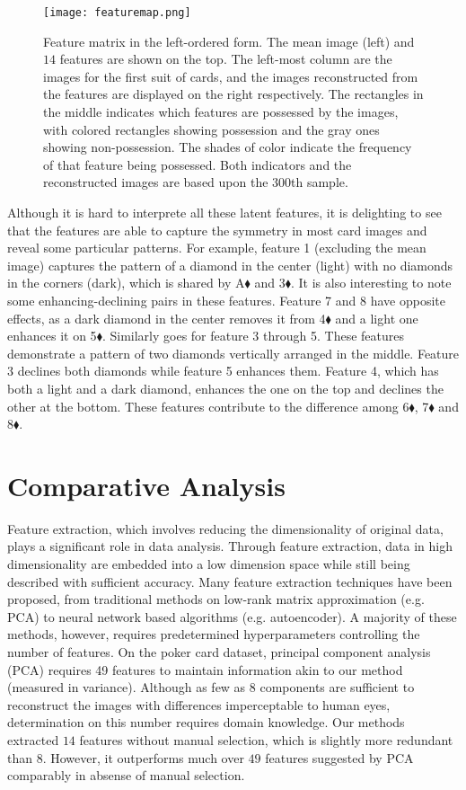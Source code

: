 \documentclass{article}
\begin{document}
\begin{figure}[!h]
  \centering
  \texttt{[image: featuremap.png]} 
  \caption{Feature matrix in the left-ordered form. The mean image (left) and $14$ features are shown on the top. The left-most column are the images for the first suit of cards, and the images reconstructed from the features are displayed on the right respectively. The rectangles in the middle indicates which features are possessed by the images, with colored rectangles showing possession and the gray ones showing non-possession. The shades of color indicate the frequency of that feature being possessed. Both indicators and the reconstructed images are based upon the 300th sample.}
  \label{fig::featuremap}
\end{figure}

Although it is hard to interprete all these latent features, it is delighting to see that the features are able to capture the symmetry in most card images and reveal some particular patterns. For example, feature 1 (excluding the mean image) captures the pattern of a diamond in the center (light) with no diamonds in the corners (dark), which is shared by A$\blacklozenge$ and 3$\blacklozenge$. It is also interesting to note some enhancing-declining pairs in these features. Feature 7 and 8 have opposite effects, as a dark diamond in the center removes it from 4$\blacklozenge$ and a light one enhances it on 5$\blacklozenge$. Similarly goes for feature 3 through 5. These features demonstrate a pattern of two diamonds vertically arranged in the middle. Feature 3 declines both diamonds while feature 5 enhances them. Feature 4, which has both a light and a dark diamond, enhances the one on the top and declines the other at the bottom. These features contribute to the difference among 6$\blacklozenge$, 7$\blacklozenge$ and 8$\blacklozenge$.



\section{Comparative Analysis}\label{sec::comparison}
Feature extraction, which involves reducing the dimensionality of original data, plays a significant role in data analysis. Through feature extraction, data in high dimensionality are embedded into a low dimension space while still being described with sufficient accuracy. Many feature extraction techniques have been proposed, from traditional methods on low-rank matrix approximation (e.g. PCA) to neural network based algorithms (e.g. autoencoder). A majority of these methods, however, requires predetermined hyperparameters controlling the number of features. On the poker card dataset, principal component analysis (PCA) requires 49 features to maintain information akin to our method (measured in variance). Although as few as $8$ components are sufficient to reconstruct the images with differences imperceptable to human eyes, determination on this number requires domain knowledge. Our methods extracted $14$ features without manual selection, which is slightly more redundant than $8$. However, it outperforms much over $49$ features suggested by PCA comparably in absense of manual selection.
\end{document}
